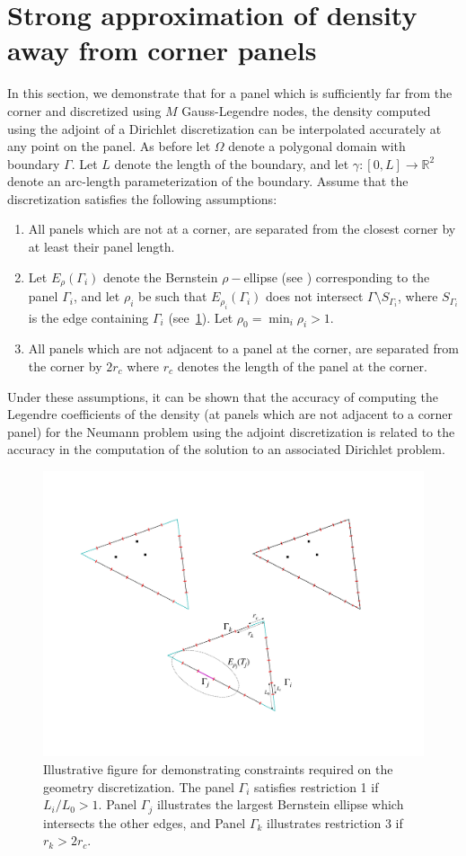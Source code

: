 \documentclass[12pt]{elsarticle}
\begin{document}
\section{Strong approximation of density away from corner panels}
\label{sec:appb}
In this section, we demonstrate that for a panel which is sufficiently far from the corner and  discretized using $M$ Gauss-Legendre nodes, the density computed using the adjoint of a Dirichlet discretization can be interpolated 
accurately at any point on the panel. As before let $\Omega$ denote a polygonal domain with boundary $\Gamma$. Let
$L$ denote the length of the boundary, and let $\gamma: [0,L]\to \mathbb{R}^2$ denote an arc-length parameterization of the boundary.
Assume that the discretization satisfies the following assumptions:
\begin{enumerate}
\item All panels which are not at a corner, are separated from the closest corner by at least their panel length.
\item Let $E_{\rho}(\Gamma_{i})$ denote the Bernstein $\rho-$ellipse (see \cite{tref_approx}) corresponding to the panel $\Gamma_{i}$, and let $\rho_{i}$ 
be such that $E_{\rho_{i}}(\Gamma_{i})$ does not intersect $\Gamma \setminus S_{\Gamma_{i}}$, where 
$S_{\Gamma_{i}}$ is the edge containing $\Gamma_{i}$ (see~\cref{fig:illus-cons}). Let $\rho_{0} = \min_{i} \rho_{i} >1$.
\item All panels which are not adjacent to a panel at the corner, are separated from the corner by $2r_{c}$ where $r_{c}$ 
denotes the length of the panel at the corner.
\end{enumerate}
Under these assumptions, it can be shown that the accuracy of computing the
Legendre coefficients of the density (at panels which are not adjacent to a corner panel) for the Neumann problem using the adjoint discretization is related to the accuracy 
in the computation of the solution to an associated Dirichlet problem.
\begin{figure}
\begin{center}
\includegraphics[width=0.3\linewidth]{paper-figs/geom-restriction-illus}
\caption{Illustrative figure for demonstrating constraints required on the geometry discretization. The panel $\Gamma_{i}$ satisfies restriction 1 if $L_{i}/L_{0}>1$. Panel $\Gamma_{j}$ illustrates the largest Bernstein ellipse which intersects the other edges, and Panel $\Gamma_{k}$ illustrates restriction 3 if $r_{k}>2r_{c}$. }
\label{fig:illus-cons}
\end{center}
\end{figure}
\end{document}
